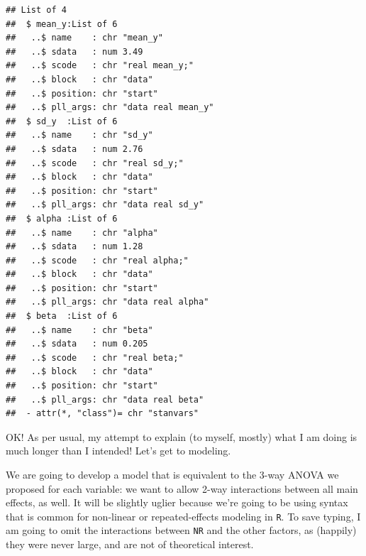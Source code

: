 \documentclass[
]{book}
\begin{document}
\begin{verbatim}
## List of 4
##  $ mean_y:List of 6
##   ..$ name    : chr "mean_y"
##   ..$ sdata   : num 3.49
##   ..$ scode   : chr "real mean_y;"
##   ..$ block   : chr "data"
##   ..$ position: chr "start"
##   ..$ pll_args: chr "data real mean_y"
##  $ sd_y  :List of 6
##   ..$ name    : chr "sd_y"
##   ..$ sdata   : num 2.76
##   ..$ scode   : chr "real sd_y;"
##   ..$ block   : chr "data"
##   ..$ position: chr "start"
##   ..$ pll_args: chr "data real sd_y"
##  $ alpha :List of 6
##   ..$ name    : chr "alpha"
##   ..$ sdata   : num 1.28
##   ..$ scode   : chr "real alpha;"
##   ..$ block   : chr "data"
##   ..$ position: chr "start"
##   ..$ pll_args: chr "data real alpha"
##  $ beta  :List of 6
##   ..$ name    : chr "beta"
##   ..$ sdata   : num 0.205
##   ..$ scode   : chr "real beta;"
##   ..$ block   : chr "data"
##   ..$ position: chr "start"
##   ..$ pll_args: chr "data real beta"
##  - attr(*, "class")= chr "stanvars"
\end{verbatim}

OK! As per usual, my attempt to explain (to myself, mostly) what I am doing is much longer than I intended! Let's get to modeling.

We are going to develop a model that is equivalent to the 3-way ANOVA we proposed for each variable: we want to allow 2-way interactions between all main effects, as well. It will be slightly uglier because we're going to be using syntax that is common for non-linear or repeated-effects modeling in \texttt{R}. To save typing, I am going to omit the interactions between \texttt{NR} and the other factors, as (happily) they were never large, and are not of theoretical interest.
\end{document}
